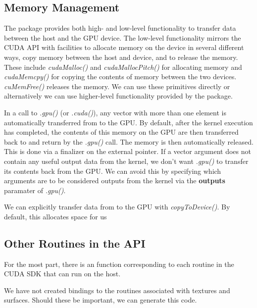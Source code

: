 \documentclass[article]{jss}
\def\R{\proglang{R}}
\def\Rpkg#1{\pkg{#1}}
\def\Rfunc#1{\textsl{#1()}}
\def\Rarg#1{\textbf{#1}}
\begin{document}
\subsection{Memory Management}
The \Rpkg{RCUDA} package provides both high- and low-level
functionality to transfer data between the host and the GPU device.
The low-level functionality mirrors the CUDA API with facilities to
allocate memory on the device in several different ways, copy memory
between the host and device, and to release the memory.  These include
\Rfunc{cudaMalloc} and \Rfunc{cudaMallocPitch} for allocating memory
and \Rfunc{cudaMemcpy} for copying the contents of memory between the
two devices.  \Rfunc{cuMemFree} releases the memory.
We can use these primitives directly or alternatively
we can use higher-level functionality provided by the package.


In a call to \Rfunc{.gpu} (or \Rfunc{.cuda}), any \R{} vector with
more than one element is automatically transferred from \R{} to the
GPU.  By default, after the kernel execution has completed, the
contents of this memory on the GPU are then transferred back to \R{}
and return by the \Rfunc{.gpu} call.  The memory is then automatically
released. This is done via a finalizer on the external pointer.
If a vector argument does not contain any useful output data from the
kernel, we don't want \Rfunc{.gpu} to transfer its contents back from
the GPU.  We can avoid this by specifying which arguments
are to be considered outputs from the kernel via the \Rarg{outputs}
paramater of \Rfunc{.gpu}.

We can explicitly transfer data from \R{} to the GPU
with \Rfunc{copyToDevice}.
By default, this allocates space for us




\subsection{Other Routines in the API}

For the most part, there is an \R{} function corresponding 
to  each routine in the CUDA SDK  that can run on the host.

We have not created bindings to the routines associated with textures
and surfaces.  Should these be important, we can generate this code.
 



\end{document}
